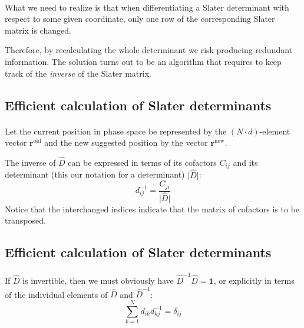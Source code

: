 \documentclass[%
twoside,                 %
final,                   %
10pt]{article}
\begin{document}
\paragraph{}

What we need to realize is that when differentiating a Slater
determinant with respect to some given coordinate, only one row of the
corresponding Slater matrix is changed. 

Therefore, by recalculating
the whole determinant we risk producing redundant information. The
solution turns out to be an algorithm that requires to keep track of
the \emph{inverse} of the Slater matrix.




\subsection*{Efficient calculation of Slater determinants}

\paragraph{}

Let the current position in phase space be represented by the $(N\cdot d)$-element 
vector $\mathbf{r}^{\mathrm{old}}$ and the new suggested
position by the vector $\mathbf{r}^{\mathrm{new}}$.

The inverse of $\hat{D}$ can be expressed in terms of its
cofactors $C_{ij}$ and its determinant (this our notation for a determinant) $\vert\hat{D}\vert$:
\begin{equation}
d_{ij}^{-1} = \frac{C_{ji}}{\vert\hat{D}\vert}
\label{eq:inverse_cofactor}
\end{equation}
Notice that the interchanged indices indicate that the matrix of cofactors is to be transposed.




\subsection*{Efficient calculation of Slater determinants}

\paragraph{}
If $\hat{D}$ is invertible, then we must obviously have $\hat{D}^{-1}\hat{D}= \mathbf{1}$, or explicitly in terms of the individual
elements of $\hat{D}$ and $\hat{D}^{-1}$:
\begin{equation}
\sum_{k=1}^N d_{ik}^{\phantom X}d_{kj}^{-1} = \delta_{ij}^{\phantom X}
\label{eq:unity_explicitely}
\end{equation}
\end{document}
